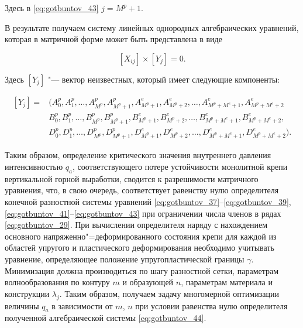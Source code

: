 Здесь в \eqref{eq:gotbuntov_43} $j=M^p +1$.



В результате получаем систему линейных однородных алгебраических уравнений, которая в матричной форме может быть представлена в виде

\begin{equation} 

[X_{ij}]\times[Y_j]=0. 

\label{eq:gotbuntov_44}

\end{equation}

Здесь $[Y_j]$ "--- вектор неизвестных, который имеет следующие компоненты:

$$

\begin{array}{ll} [Y_j]=\!\!\!\!\!&(A_0^p,A_1^p,\ldots,A_{M^p}^p,A_{M^p +1}^p,A_{M^p+1}^e,A_{M^p+2}^e,\ldots,A_{M^p+M^e+1}^e,A_{M^p+M^e+2}^e

\\

&

B_0^p,B_1^p,\ldots,B_{M^p}^p,B_{M^p+1}^p,B_{M^p+1}^e,B_{M^p+2}^e,\ldots,B_{M^p+M^e+1}^e,B_{M^p+M^e+2}^e,

\\

&

D_0^p,D_1^p,\ldots,D_{M^p}^p,D_{M^p+1}^p,D_{M^p+1}^e,D_{M^p+2}^e,\ldots,D_{M^p+M^e+1}^e,D_{M^p+M^e+2}^e). 

\end{array} 

$$



Таким образом, определение критического значения внутреннего давления интенсивностью $q_a$, соответствующего потере устойчивости монолитной крепи вертикальной горной выработки, сводится к разрешимости матричного уравнения, что, в свою очередь, соответствует равенству нулю определителя конечной разностной системы уравнений \eqref{eq:gotbuntov_37}--\eqref{eq:gotbuntov_39}, \eqref{eq:gotbuntov_41}--\eqref{eq:gotbuntov_43} при ограничении числа членов в рядах \eqref{eq:gotbuntov_29}. При вычислении определителя наряду с нахождением основного напряженно"=деформированного состояния крепи для каждой из областей упругого и пластического деформирования необходимо учитывать уравнение, определяющее положение упругопластической границы $\gamma$. Минимизация должна производиться по шагу разностной сетки, параметрам волнообразования по контуру $m$ и образующей $n$, параметрам материала и конструкции $\lambda_j$. Таким образом, получаем задачу многомерной оптимизации величины $q_a$ в зависимости от $m$, $n$ при условии равенства нулю определителя полученной алгебраической системы \eqref{eq:gotbuntov_44}.



